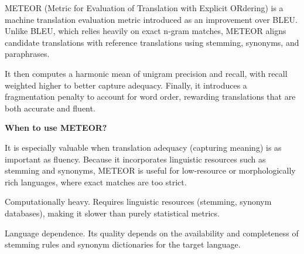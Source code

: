 METEOR (Metric for Evaluation of Translation with Explicit ORdering) is a machine translation
evaluation metric introduced as an improvement over BLEU. Unlike BLEU, which relies heavily on
exact n-gram matches, METEOR aligns candidate translations with reference translations using stemming,
synonyms, and paraphrases. 

\begin{center}
\end{center}

It then computes a harmonic mean of unigram precision and recall, with
recall weighted higher to better capture adequacy. Finally, it introduces a fragmentation penalty to
account for word order, rewarding translations that are both accurate and fluent.

\textbf{When to use METEOR?}

It is especially valuable when translation adequacy (capturing meaning) is as important as fluency.
Because it incorporates linguistic resources such as stemming and synonyms, METEOR is useful for
low-resource or morphologically rich languages, where exact matches are too strict.

{
\item Computationally heavy. Requires linguistic resources (stemming, synonym databases),
making it slower than purely statistical metrics.
\item Language dependence. Its quality depends on the availability and completeness of stemming
rules and synonym dictionaries for the target language.
}

